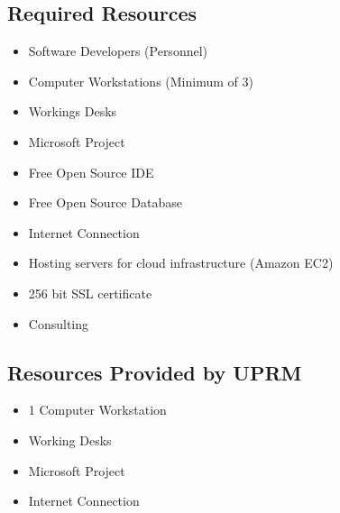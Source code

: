 
\subsection{Required Resources}
\begin{itemize}
\item Software Developers (Personnel)
\item Computer Workstations (Minimum of 3)
\item Workings Desks
\item Microsoft Project
\item Free Open Source IDE
\item Free Open Source Database
\item Internet Connection
\item Hosting servers for cloud infrastructure (Amazon EC2)
\item 256 bit SSL certificate
\item Consulting
\end{itemize}

\subsection{Resources Provided by UPRM}
\begin{itemize}
\item 1 Computer Workstation
\item Working Desks
\item Microsoft Project
\item Internet Connection

\end{itemize}
